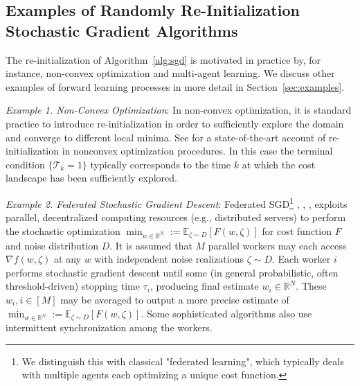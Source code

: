 \documentclass[journal,onecolumn]{IEEEtran}
\newcommand{\grad}{\nabla}
\newcommand{\reals}{\mathbb{R}}
\newcommand{\CE}{\mathbb{E}}
\newcommand{\dimn}{N}
\begin{document}
{%

\subsection{Examples of  Randomly Re-Initialization Stochastic Gradient Algorithms} The re-initialization of Algorithm~\ref{alg:sgd} is motivated in practice by, for instance, non-convex optimization and multi-agent learning. We discuss other examples of forward learning processes in more detail in Section~\ref{sec:examples}.

{\em Example 1. Non-Convex Optimization}: 
In non-convex optimization, it is standard practice to introduce re-initialization in order to sufficiently explore the domain and converge to different local minima. See \cite{li2023restarted} for a state-of-the-art account of re-initialization in nonconvex optimization procedures. In this case the terminal condition $\{\mathcal{T}_k = 1\}$ typically corresponds to the time $k$ at which the cost landscape has been sufficiently explored.


{\em Example 2. Federated Stochastic Gradient Descent}: Federated SGD\footnote{We distinguish this with classical "federated learning", which typically deals with multiple agents each optimizing a unique cost function.} \cite{yuan2020federated}, \cite{mcmahan2017communication}, \cite{mangasarian1995parallel}, exploits parallel, decentralized computing resources (e.g., distributed servers) to perform the stochastic optimization $\min_{w\in\reals^{\dimn}} := \CE_{\zeta \sim D}[F(w,\zeta)]$ for cost function $F$ and noise distribution $D$. It is assumed that $M$ parallel workers may each access $\grad f(w,\zeta)$ at any $w$ with independent noise realizations $\zeta \sim D$. Each worker $i$ performs stochastic gradient descent until some (in general probabilistic, often threshold-driven) stopping time $\tau_i$, producing final estimate $w_i \in \reals^{\dimn}$. These $w_i, i\in[M]$ may be averaged to output a more precise estimate of $\min_{w\in\reals^{\dimn}} := \CE_{\zeta \sim D}[F(w,\zeta)]$. Some sophisticated algorithms also use intermittent synchronization among the workers. 
    
}
\end{document}
